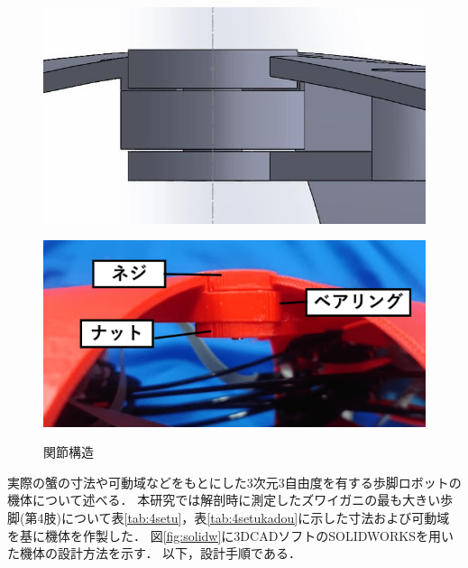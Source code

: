 %
\begin{figure}[t]
  \begin{minipage}{0.5\hsize}
    \centering
    \vspace{3mm}
    \includegraphics[scale=0.32]{image/bearingu.JPG}
    \label{fig:bearingus}
  \end{minipage}
  \begin{minipage}{0.5\hsize}
    \centering
    \vspace{7mm}
    \includegraphics[scale=0.2]{image/bearinguj.png}
    \label{fig:bearinguj}
  \end{minipage}
  \caption{関節構造}
  \label{fig:bearingu}
\end{figure}
実際の蟹の寸法や可動域などをもとにした3次元3自由度を有する歩脚ロボットの機体について述べる．
本研究では解剖時に測定したズワイガニの最も大きい歩脚(第4肢)について表\ref{tab:4setu}，表\ref{tab:4setukadou}に示した寸法および可動域を基に機体を作製した．
図\ref{fig:solidw}に3DCADソフトのSOLIDWORKSを用いた機体の設計方法を示す．
以下，設計手順である．
\vspace{3mm}
